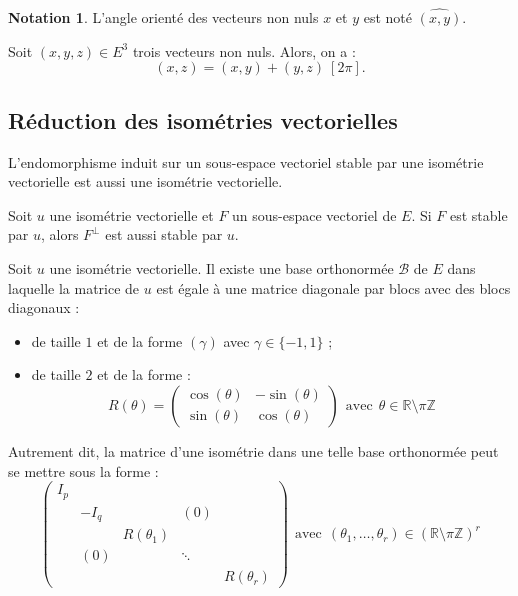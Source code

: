 \documentclass[french]{article}
\newcommand{\Z}{\mathbb{Z}}
\newcommand{\R}{\mathbb{R}}
\theoremstyle{plain}
\theoremstyle{definition}
\newtheorem*{notation}{Notation}
\theoremstyle{remark}
\begin{document}
\begin{notation}
	L'angle orienté des vecteurs non nuls $x$ et $y$ est noté $\widehat{(x,y)}$.
\end{notation}

\begin{prop}
	Soit $(x,y,z)\in E^3$ trois vecteurs non nuls. Alors, on a : $$(x,z)=(x,y)+(y,z)\ [2\pi].$$
\end{prop}

\subsection{Réduction des isométries vectorielles}

\begin{lem}
	L'endomorphisme induit sur un sous-espace vectoriel stable par une isométrie vectorielle est aussi une isométrie vectorielle.
\end{lem}

\begin{prop}
	Soit $u$ une isométrie vectorielle et $F$ un sous-espace vectoriel de $E$. Si $F$ est stable par $u$, alors $F^\bot$ est aussi stable par $u$.
\end{prop}

\begin{thm}
	Soit $u$ une isométrie vectorielle. Il existe une base orthonormée $\mathcal{B}$ de $E$ dans laquelle la matrice de $u$ est égale à une matrice diagonale par blocs avec des blocs diagonaux :
	\begin{itemize}
		\item de taille $1$ et de la forme $(\gamma)$ avec $\gamma\in\{-1,1\}$ ;
		\item de taille $2$ et de la forme : $$R(\theta)=\begin{pmatrix}
			\cos(\theta)&-\sin(\theta)\\
			\sin(\theta)&\cos(\theta)
		\end{pmatrix}\ \ \text{avec}\ \ \theta\in\R\setminus\pi\Z$$
	\end{itemize}
\end{thm}

Autrement dit, la matrice d'une isométrie dans une telle base orthonormée peut se mettre sous la forme : $$\begin{pmatrix}
	I_p&&&&\\
	&-I_q&&(0)&\\
	&&R(\theta_1)&&\\
	&(0)&&\ddots&\\
	&&&&R(\theta_r)
\end{pmatrix}\ \ \text{avec}\ \ (\theta_1,\ldots,\theta_r)\in\left(\R\setminus\pi\Z\right)^r$$
\end{document}
